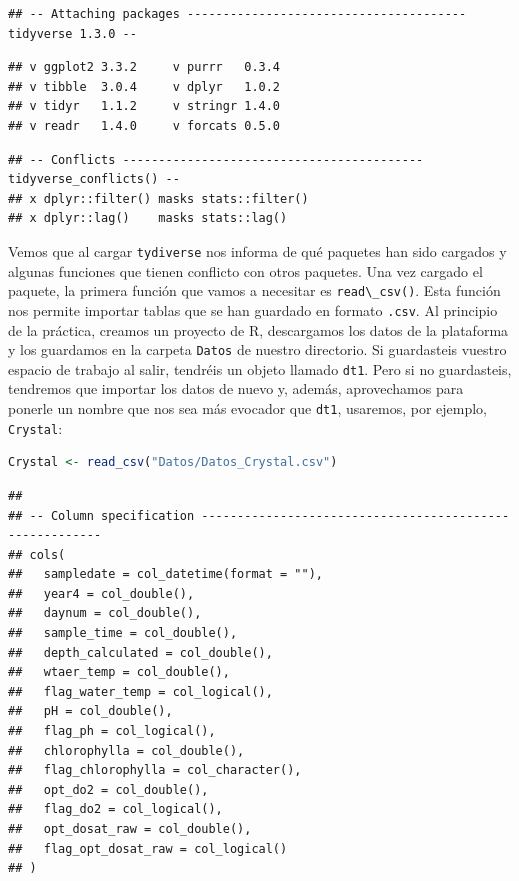\documentclass[
]{book}
\newcommand{\passthrough}[1]{#1}
\begin{document}
\begin{lstlisting}
## -- Attaching packages --------------------------------------- tidyverse 1.3.0 --
\end{lstlisting}

\begin{lstlisting}
## v ggplot2 3.3.2     v purrr   0.3.4
## v tibble  3.0.4     v dplyr   1.0.2
## v tidyr   1.1.2     v stringr 1.4.0
## v readr   1.4.0     v forcats 0.5.0
\end{lstlisting}

\begin{lstlisting}
## -- Conflicts ------------------------------------------ tidyverse_conflicts() --
## x dplyr::filter() masks stats::filter()
## x dplyr::lag()    masks stats::lag()
\end{lstlisting}

Vemos que al cargar \passthrough{\lstinline!tydiverse!} nos informa de qué paquetes han sido cargados y algunas funciones que tienen conflicto con otros paquetes.
Una vez cargado el paquete, la primera función que vamos a necesitar es \passthrough{\lstinline!read\_csv()!}. Esta función nos permite importar tablas que se han guardado en formato \passthrough{\lstinline!.csv!}. Al principio de la práctica, creamos un proyecto de R, descargamos los datos de la plataforma y los guardamos en la carpeta \passthrough{\lstinline!Datos!} de nuestro directorio. Si guardasteis vuestro espacio de trabajo al salir, tendréis un objeto llamado \passthrough{\lstinline!dt1!}. Pero si no guardasteis, tendremos que importar los datos de nuevo y, además, aprovechamos para ponerle un nombre que nos sea más evocador que \passthrough{\lstinline!dt1!}, usaremos, por ejemplo, \passthrough{\lstinline!Crystal!}:

\begin{lstlisting}[language=R]
Crystal <- read_csv("Datos/Datos_Crystal.csv")
\end{lstlisting}

\begin{lstlisting}
## 
## -- Column specification --------------------------------------------------------
## cols(
##   sampledate = col_datetime(format = ""),
##   year4 = col_double(),
##   daynum = col_double(),
##   sample_time = col_double(),
##   depth_calculated = col_double(),
##   wtaer_temp = col_double(),
##   flag_water_temp = col_logical(),
##   pH = col_double(),
##   flag_ph = col_logical(),
##   chlorophylla = col_double(),
##   flag_chlorophylla = col_character(),
##   opt_do2 = col_double(),
##   flag_do2 = col_logical(),
##   opt_dosat_raw = col_double(),
##   flag_opt_dosat_raw = col_logical()
## )
\end{lstlisting}
\end{document}
